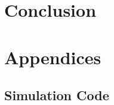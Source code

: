\documentclass[a4paper,12pt]{article}
\begin{document}
\section{Conclusion}
%
%

   



\appendix
\section{Appendices}

%

\subsection{Simulation Code}
\end{document}
